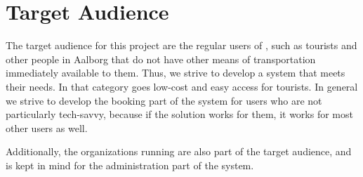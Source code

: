 \section{Target Audience}\label{sec:ta}
The target audience for this project are the regular users of \bycykelwithoutspace, such as tourists and other people in Aalborg that do not have other means of transportation immediately available to them. 
Thus, we strive to develop a system that meets their needs.
In that category goes low-cost and easy access for tourists.
In general we strive to develop the booking part of the system for users who are not particularly tech-savvy, because if the solution works for them, it works for most other users as well.

Additionally, the organizations running \bycykel are also part of the target audience, and is kept in mind for the administration part of the system.